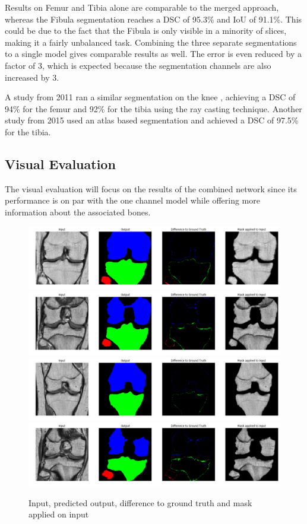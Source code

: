 Results on Femur and Tibia alone are comparable to the merged approach, whereas the Fibula segmentation reaches a DSC of 95.3\% and IoU of 91.1\%. This could be due to the fact that the Fibula is only visible in a minority of slices, making it a fairly unbalanced task. Combining the three separate segmentations to a single model gives comparable results as well. The error is even reduced by a factor of 3, which is expected because the segmentation channels are also increased by 3.

A study from 2011 ran a similar segmentation on the knee \cite{Martel-Pelletier2011}, achieving a DSC of 94\% for the femur and 92\% for the tibia using the ray casting technique. Another study from 2015 \cite{Dam} used an atlas based segmentation and achieved a DSC of 97.5\% for the tibia.

\subsection{Visual Evaluation}

The visual evaluation will focus on the results of the combined network since its performance is on par with the one channel model while offering more information about the associated bones.

\begin{figure}[H]
\centering
\par
\includegraphics[width=1.0\textwidth]{imgs/sample1.png}
\includegraphics[width=1.0\textwidth]{imgs/sample2.png}
\includegraphics[width=1.0\textwidth]{imgs/sample4.png}
\includegraphics[width=1.0\textwidth]{imgs/sample3.png}
\caption{Input, predicted output, difference to ground truth and mask applied on input}
\par
\end{figure}

